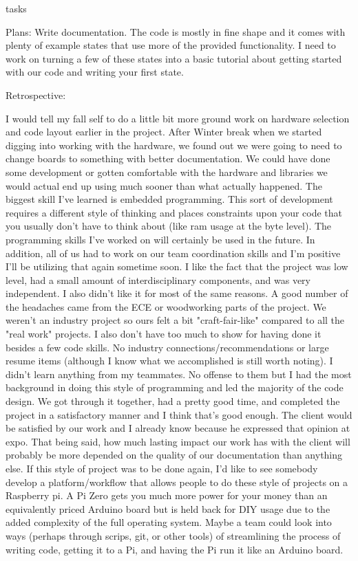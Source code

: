 tasks\documentclass[onecolumn, draftclsnofoot,10pt, compsoc]{IEEEtran}
\begin{document}
Plans: Write documentation. The code is mostly in fine shape and it comes with plenty of example states that use more of the provided functionality. I need to work on turning a few of these states into a basic tutorial about getting started with our code and writing your first state.

Retrospective:

I would tell my fall self to do a little bit more ground work on hardware selection and code layout earlier in the project. After Winter break when we started digging into working with the hardware, we found out we were going to need to change boards to something with better documentation. We could have done some development or gotten comfortable with the hardware and libraries we would actual end up using much sooner than what actually happened.
The biggest skill I've learned is embedded programming. This sort of development requires a different style of thinking and places constraints upon your code that you usually don't have to think about (like ram usage at the byte level).
The programming skills I've worked on will certainly be used in the future. In addition, all of us had to work on our team coordination skills and I'm positive I'll be utilizing that again sometime soon.
I like the fact that the project was low level, had a small amount of interdisciplinary components, and was very independent. I also didn't like it for most of the same reasons. A good number of the headaches came from the ECE or woodworking parts of the project. We weren't an industry project so ours felt a bit "craft-fair-like" compared to all the "real work" projects. I also don't have too much to show for having done it besides a few code skills. No industry connections/recommendations or large resume items (although I know what we accomplished is still worth noting).
I didn't learn anything from my teammates. No offense to them but I had the most background in doing this style of programming and led the majority of the code design. We got through it together, had a pretty good time, and completed the project in a satisfactory manner and I think that's good enough.
The client would be satisfied by our work and I already know because he expressed that opinion at expo. That being said, how much lasting impact our work has with the client will probably be more depended on the quality of our documentation than anything else.
If this style of project was to be done again, I'd like to see somebody develop a platform/workflow that allows people to do these style of projects on a Raspberry pi. A Pi Zero gets you much more power for your money than an equivalently priced Arduino board but is held back for DIY usage due to the added complexity of the full operating system. Maybe a team could look into ways (perhaps through scrips, git, or other tools) of streamlining the process of writing code, getting it to a Pi, and having the Pi run it like an Arduino board.
\end{document}

